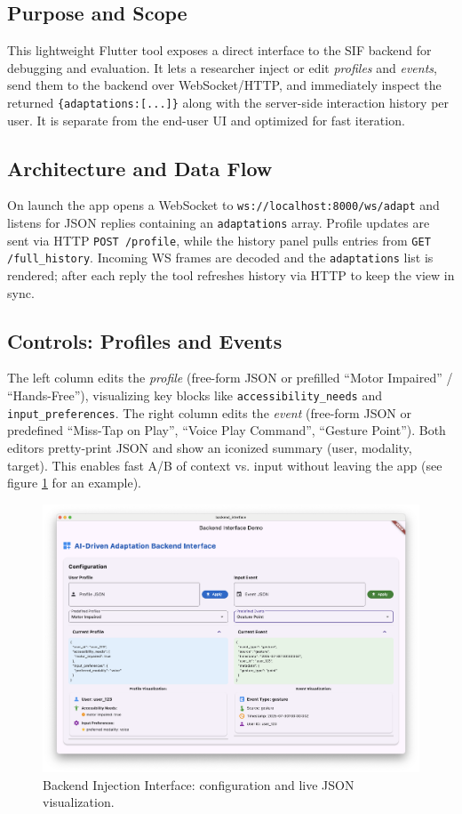 \subsection{Purpose and Scope}
This lightweight Flutter tool exposes a direct interface to the SIF backend for debugging and evaluation. It lets a researcher inject or edit \emph{profiles} and \emph{events}, send them to the backend over WebSocket/HTTP, and immediately inspect the returned \texttt{\{adaptations:[...]\}} along with the server-side interaction history per user. It is separate from the end-user UI and optimized for fast iteration. 

\subsection{Architecture and Data Flow}
On launch the app opens a WebSocket to \texttt{ws://localhost:8000/ws/adapt} and listens for JSON replies containing an \texttt{adaptations} array. Profile updates are sent via HTTP \texttt{POST /profile}, while the history panel pulls entries from \texttt{GET /full\_history}. Incoming WS frames are decoded and the \texttt{adaptations} list is rendered; after each reply the tool refreshes history via HTTP to keep the view in sync. 

\subsection{Controls: Profiles and Events}
The left column edits the \emph{profile} (free-form JSON or prefilled “Motor Impaired” / “Hands-Free”), visualizing key blocks like \texttt{accessibility\_needs} and \texttt{input\_preferences}. The right column edits the \emph{event} (free-form JSON or predefined “Miss-Tap on Play”, “Voice Play Command”, “Gesture Point”). Both editors pretty-print JSON and show an iconized summary (user, modality, target). This enables fast A/B of context vs. input without leaving the app (see figure \ref{fig:backend-inject-adapt-config} for an example).

\begin{figure}[h]
\centering
\includegraphics[width=.5\linewidth]{images/fig_backend_inject_config.png}\hfill
\caption{Backend Injection Interface: configuration and live JSON visualization.}
\label{fig:backend-inject-adapt-config}
\end{figure}

